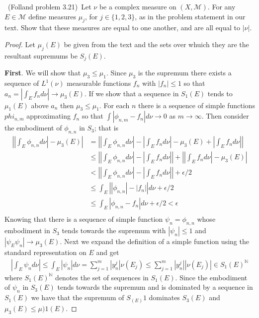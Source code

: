 \documentclass[11pt]{amsart}
\theoremstyle{definition}
\numberwithin{theorem}{section}
\numberwithin{definition}{section}
\numberwithin{equation}{section}
\def\scriptm{{\mathcal M}}
\begin{document}
\medskip {}\ (Folland problem 3.21)\ 
Let $\nu$ be a complex measure on $(X,\scriptm)$.
For any $E\in\scriptm$ define measures $\mu_j$, for $j\in\{1,2,3\}$,
as in the problem statement in our text. 
Show that these measures are equal to one another,
and are all equal to $|\nu|$. 
\begin{proof}
	Let $\mu_j(E)$ be given from the text and the sets over whuich they are the resultant supremums be $S_j(E)$. 

	\textbf{First}. We will show that $\mu_3 \leq \mu_1$. Since $\mu_3$ is the supremum there exists a sequence of $L^1(\nu)$ measurable functions $f_n$ with $|f_n| \leq 1$ so that $a_n=|\int_E f_n d\nu| \to \mu_3(E)$. If we show that a sequence in $S_1(E)$ tends to $\mu_1(E)$ above $a_n$ then $\mu_3 \leq \mu_1$. For each $n$ there is a sequence of simple functions $phi_{n,m}$ approximating $f_n$ so that $\int|\phi_{n,m} - f_n| d\nu \to 0$ as $m \to \infty$.
	Then consider the embodiment of $\phi_{n,n}$ in $S_3$; that is
	\begin{equation*}
		\begin{aligned}
			\left|\left|\int_E \phi_{n,n} d\nu \right| - \mu_3(E)\right| &= \left|\left|\int_E \phi_{n,n} d\nu \right| - \left|\int_E f_n d\nu \right| - \mu_3(E) + \left|\int_E f_n d\nu \right|\right| \\
			&\leq \left|\left|\int_E \phi_{n,n} d\nu \right| - \left|\int_E f_n d\nu \right|\right| + \left| \left|\int_E f_n d\nu \right|  - \mu_3(E)\right| \\
			&< \left|\left|\int_E \phi_{n,n} d\nu \right| - \left|\int_E f_n d\nu \right|\right| + \epsilon/2 \\
			&\leq \int_E \left|\left|\phi_{n,n} \right| - \left| f_n \right|\right| d\nu  + \epsilon/2 \\
			&\leq \int_E \left|\phi_{n,n}  - f_n \right| d\nu  + \epsilon/2  < \epsilon\\
		\end{aligned}
	\end{equation*}
	Knowing that there is a sequence of simple function $\psi_n = \phi_{n,n}$ whose embodiment in $S_3$ tends towards the supremum with $|\psi_n| \leq 1$ and $|\psi_E \psi_n| \to \mu_3(E).$
	Next we expand the definition of a simple function using the standard representation on $E$ and get
	\begin{equation*}
		\begin{aligned}
			\left|\int_E \psi_n d \nu\right| \leq \int_E |\psi_n| d \nu = \sum_{j=1}^m |y_n^j| \nu(E_j)
			\leq \sum_{j=1}^m |y_n^j| |\nu(E_j)| \in S_1(E)^\mathbb{N}
		\end{aligned}
	\end{equation*}
	where $ S_1(E)^\mathbb{N}$ denotes the set of sequences in $S_1(E)$. Since the embodiment of $\psi_n$ in $S_3(E)$ tends
	towards the supremum and is dominated by a sequence in $S_1(E)$ we have that the supremum of $S_(E)1$ dominates $S_3(E)$ and $\mu_3(E) \leq \mu)1(E).$


\end{proof}
\end{document}
